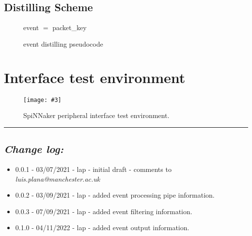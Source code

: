 \documentclass[11pt,a4paper,twoside]{article}
\newcommand{\image}[5][]
{
\begin{figure}[#2]
   \begin{center}
      \texttt{[image: \#3]}
      \caption{#5}
      \label{fig:#4}
   \end{center}
\end{figure}
}
\begin{document}
\subsection{Distilling Scheme}


\begin{figure}[!ht]
	\centering
	\begin{minipage}{0.5\columnwidth}
		\begin{algorithm}[H]
			\caption{event distilling pseudocode}
			\begin{algorithmic}[1]
				\State event $=$ packet\_key
			\end{algorithmic}
			\label{alg:filter}
		\end{algorithm}
	\end{minipage}
\end{figure}


\clearpage
\section{Interface test environment}


\image[width = 0.8 \textwidth]{!h}{spif_test_env}{fig:spif_test}
{SpiNNaker peripheral interface test environment.}


\vspace*{1.0cm}
\par\noindent\rule{\linewidth}{2pt}


\subsection*{\itshape Change log:}


\begin{itemize}
	 mm 
	\item 0.0.1 - 03/07/2021 - lap - initial draft - comments to {\itshape luis.plana@manchester.ac.uk}
	\item 0.0.2 - 03/09/2021 - lap - added event processing pipe information.
	\item 0.0.3 - 07/09/2021 - lap - added event filtering information.
	\item 0.1.0 - 04/11/2022 - lap - added event output information.
\end{itemize}
\end{document}
